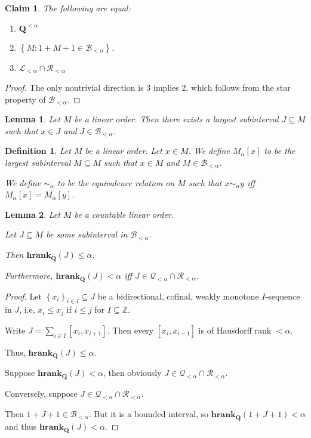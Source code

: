 \documentclass{article}
\newtheorem{lemma}{Lemma}
\newtheorem{claim}{Claim}
\newtheorem{definition}{Definition}
\newcommand{\braces}[1]{\left\{ {#1} \right\}}
\newcommand{\setcomp}[1]{\braces{#1}}
\newcommand{\hrank}[1]{\mathbf{hrank}_{\qq}\left( #1 \right)}
\newcommand{\qq}{\mathbf{Q}}
\newcommand{\ZZ}{\mathbb{Z}}
\begin{document}
\begin{claim}
  The following are equal:

  \begin{enumerate}
    \item $\qq^{< \alpha}$
    \item $\setcomp{M : 1 + M + 1 \in \mathcal{B}_{< \alpha}}$.
    \item $\mathcal{L}_{< \alpha} \cap \mathcal{R}_{< \alpha}$
  \end{enumerate}

\end{claim}

\begin{proof}
  The only nontrivial direction is 3 implies 2, which follows from the star property
  of $\mathcal{B}_{< \alpha}$.
\end{proof}

\begin{lemma}
  Let $M$ be a linear order. Then there exists a largest subinterval $J \subseteq M$ such that
  $x \in J$ and $J \in \mathcal{B}_{< \alpha}$.
\end{lemma}

\begin{definition}
  Let $M$ be a linear order. Let $x \in M$. We define $M_{\alpha}[x]$ to be the largest subinterval
  $M \subseteq M$ such that $x \in M$ and $M \in \mathcal{B}_{< \alpha}$.

  We define $\sim_{\alpha}$ to be the equivalence relation on $M$ such that $x \sim_{\alpha} y$ iff
  $M_{\alpha}[x] = M_{\alpha}[y]$.
\end{definition}

\begin{lemma}
  Let $M$ be a countable linear order.

  Let $J \subseteq M$ be some subinterval in $\mathcal{B}_{< \alpha}$.

  Then $\hrank{J} \le \alpha$.

  Furthermore, $\hrank{J} < \alpha$ iff $J \in \mathcal{Q_{< \alpha}} \cap \mathcal{R_{< \alpha}}$.
\end{lemma}

\begin{proof}
  Let $\setcomp{x_i}_{i \in I} \subseteq J$ be a bidirectional, cofinal, weakly monotone $I$-sequence in $J$, i.e,
  $x_i \le x_j$ if $i \le j$ for $I \subseteq \ZZ$.

  Write $J = \sum_{i \in I} [x_i, x_{i+1}]$. Then every $[x_i, x_{i+1}]$ is of Hausdorff rank $< \alpha$.

  Thus, $\hrank{J} \le \alpha$.

  Suppose $\hrank{J} < \alpha$, then obviously $J \in \mathcal{Q_{< \alpha}} \cap \mathcal{R_{< \alpha}}$.

  Conversely, suppose $J \in \mathcal{Q_{< \alpha}} \cap \mathcal{R_{< \alpha}}$.

  Then $1 + J + 1 \in \mathcal{B}_{< \alpha}$. But it is a bounded interval,
  so $\hrank{1 + J + 1} < \alpha$ and thus $\hrank{J} < \alpha$.
\end{proof}
\end{document}
